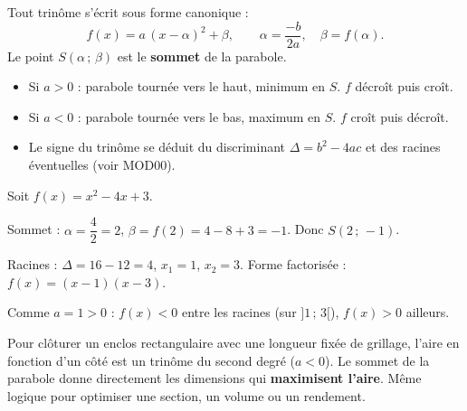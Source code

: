 \documentclass[a4paper,11pt]{article}
\begin{document}
\begin{theoreme}
Tout trinôme s'écrit sous forme canonique :
\[
f(x) = a\,(x - \alpha)^2 + \beta, \qquad \alpha = \frac{-b}{2a}, \quad \beta = f(\alpha).
\]
Le point $S(\alpha\,;\,\beta)$ est le \textbf{sommet} de la parabole.
\end{theoreme}

\begin{theoreme}
\begin{itemize}
  \item Si $a > 0$ : parabole tournée vers le haut, minimum en $S$. $f$ décroît puis croît.
  \item Si $a < 0$ : parabole tournée vers le bas, maximum en $S$. $f$ croît puis décroît.
  \item Le signe du trinôme se déduit du discriminant $\Delta = b^2 - 4ac$ et des racines éventuelles (voir MOD00).
\end{itemize}
\end{theoreme}

\begin{exemple}
Soit $f(x) = x^2 - 4x + 3$.

Sommet : $\alpha = \dfrac{4}{2} = 2$, $\beta = f(2) = 4 - 8 + 3 = -1$. Donc $S(2\,;\,-1)$.

Racines : $\Delta = 16 - 12 = 4$, $x_1 = 1$, $x_2 = 3$. Forme factorisée : $f(x) = (x-1)(x-3)$.

Comme $a = 1 > 0$ : $f(x) < 0$ entre les racines (sur $]1\,;\,3[$), $f(x) > 0$ ailleurs.
\end{exemple}

\begin{center}
\end{center}

\begin{appliindus}
Pour clôturer un enclos rectangulaire avec une longueur fixée de grillage, l'aire en fonction d'un côté est un trinôme du second degré ($a < 0$). Le sommet de la parabole donne directement les dimensions qui \textbf{maximisent l'aire}. Même logique pour optimiser une section, un volume ou un rendement.
\end{appliindus}
\end{document}
